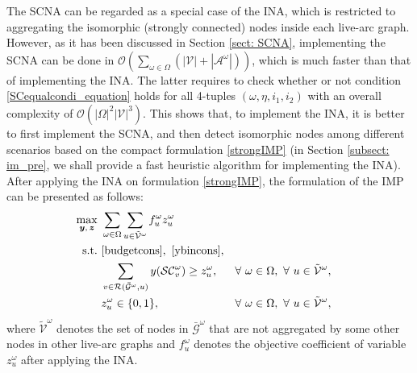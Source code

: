 \documentclass[a4paper,10pt]{article}
\theoremstyle{plain}
\newtheorem{remark}[theorem]{Remark}
\newcommand{\revv}[1]{{#1}}
\begin{document}
	The SCNA can be regarded as a special case of the INA, which is restricted to aggregating the isomorphic (strongly connected) nodes inside each live-arc graph.
	However, as it has been discussed in \revv{Section} \ref{sect: SCNA}, implementing the SCNA can be done in $\mathcal{O}(\sum_{\omega\in \Omega}(|\mathcal{V}|+|\mathcal{A}^\omega|))$, 
	which is much faster than that of implementing the INA.
	The latter requires to check whether or not condition \eqref{SCequalcondi_equation} holds for all 4-tuples $(\omega,\eta,i_1,i_2 )$ with an overall complexity of $\mathcal{O}({|\Omega|}^2{|\mathcal{V}|^3})$.
	This shows that, to implement the INA, it is better to first implement the SCNA, and then detect isomorphic nodes among different scenarios based on the compact formulation \eqref{strongIMP}  (in \revv{Section} \ref{subsect: im_pre}, we shall provide a fast heuristic algorithm for implementing the INA).
	After applying the INA on formulation \eqref{strongIMP}, the formulation of the IMP can be presented as follows:
	\begin{equation}\label{IMP_INA}
		\begin{aligned}
			\max_{\boldsymbol{y},\,\boldsymbol{z}}\ & \sum_{\omega\in\Omega}\sum_{u\in\tilde{\mathcal{V}}^{\omega}}f_u^{\omega}z_u^{\omega} \\
			\hbox{s.t.}\ & 	\eqref{budgetcons},~\eqref{ybincons},&&\\
			& \sum_{v\in\mathcal{R}(\bar{\mathcal{G}}^{\omega},u)}y(\mathcal{SC}_v^{\omega})\geq z_u^{\omega}, &&\forall~ \omega\in\Omega, ~\forall~ u\in\tilde{\mathcal{V}}^{\omega}, \\
			& z_{u}^{\omega} \in \{0,1\}, && \forall~ \omega\in\Omega, ~\forall~ u\in \tilde{\mathcal{V}}^{\omega},
		\end{aligned}
	\end{equation}
	where $\tilde{\mathcal{V}}^\omega$ denotes the set of nodes in $\bar{\mathcal{G}}^\omega$ that are not aggregated by \revv{some other nodes in other live-arc graphs} and $f_u^\omega$  denotes the objective coefficient of variable $z_{u}^\omega$ after applying the INA.
\end{document}
